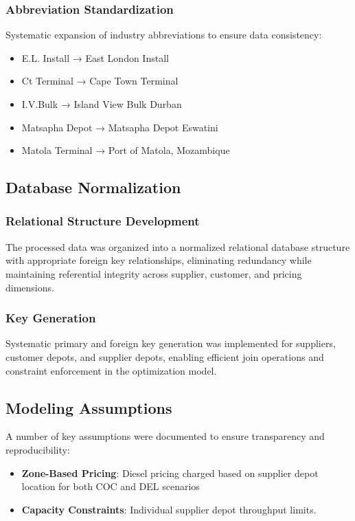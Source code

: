 \subsubsection{Abbreviation Standardization}
Systematic expansion of industry abbreviations to ensure data consistency:
\begin{itemize}
    \item E.L. Install → East London Install
    \item Ct Terminal → Cape Town Terminal  
    \item I.V.Bulk → Island View Bulk Durban
    \item Matsapha Depot → Matsapha Depot Eswatini
    \item Matola Terminal → Port of Matola, Mozambique
\end{itemize}

\subsection{Database Normalization}
\subsubsection{Relational Structure Development}
The processed data was organized into a normalized relational database structure with appropriate foreign key relationships, eliminating redundancy while maintaining referential integrity across supplier, customer, and pricing dimensions.

\subsubsection{Key Generation}
Systematic primary and foreign key generation was implemented for suppliers, customer depots, and supplier depots, enabling efficient join operations and constraint enforcement in the optimization model.

\subsection{Modeling Assumptions}
A number of key assumptions were documented to ensure transparency and reproducibility:
\begin{itemize}
    \item \textbf{Zone-Based Pricing}: Diesel pricing charged based on supplier depot location for both COC and DEL scenarios
    \item \textbf{Capacity Constraints}: Individual supplier depot throughput limits.
\end{itemize}

